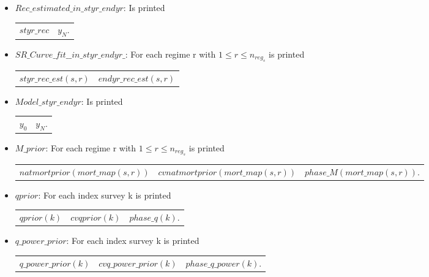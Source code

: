 \documentclass{article}
\begin{document}
\begin{itemize}
\begin{tabular}{c c c}
\end{tabular}

\item $Rec\_estimated\_in\_styr\_endyr$: Is printed 
\begin{center}
    \begin{tabular}{c c}
       $styr\_rec$  & $y_N$.  \\
         \end{tabular}
\end{center}


\item $SR\_Curve\_fit\_\_in\_styr\_endyr\_$:  For each regime r with $1\leq r \leq n_{reg_s}$ is printed \\
\begin{tabular}{c c}
   $styr\_rec\_est(s,r)$  & $endyr\_rec\_est(s,r)$ \\
     
\end{tabular}

\item $Model\_styr\_endyr$: Is printed 
\begin{center}
    \begin{tabular}{c c}
        $y_0$ & $y_N$.  \\
    \end{tabular}
\end{center}

\item $M\_prior$:  For each regime r with $1\leq r \leq n_{reg_s}$ is printed 
\begin{center}
    \begin{tabular}{c c c}
       $natmortprior(mort\_map(s,r))$  & $cvnatmortprior(mort\_map(s,r))$ & $phase\_M(mort\_map(s,r))$. \\
    \end{tabular}
\end{center}


\item $qprior$: For each index survey k is printed
\begin{center}
    \begin{tabular}{c c c}
        $qprior(k)$ &  $cvqprior(k)$ & $phase\_q(k)$. \\
    \end{tabular}
\end{center}

\item $q\_power\_prior$: For each index survey k is printed 
\begin{center}
    \begin{tabular}{c c c}
        $q\_power\_prior(k)$ & $cvq\_power\_prior(k)$ & $phase\_q\_power(k)$.  \\
        

\end{tabular}
\end{center}
\end{itemize}
\end{document}
